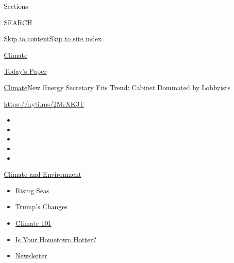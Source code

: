 Sections

SEARCH

\protect\hyperlink{site-content}{Skip to
content}\protect\hyperlink{site-index}{Skip to site index}

\href{https://www.nytimes.com/section/climate}{Climate}

\href{https://myaccount.nytimes.com/auth/login?response_type=cookie\&client_id=vi}{}

\href{https://www.nytimes.com/section/todayspaper}{Today's Paper}

\href{/section/climate}{Climate}\textbar{}New Energy Secretary Fits
Trend: Cabinet Dominated by Lobbyists

\url{https://nyti.ms/2MrXK3T}

\begin{itemize}
\item
\item
\item
\item
\item
\end{itemize}

\href{https://www.nytimes.com/section/climate?action=click\&pgtype=Article\&state=default\&region=TOP_BANNER\&context=storylines_menu}{Climate
and Environment}

\begin{itemize}
\tightlist
\item
  \href{https://www.nytimes.com/2020/07/30/climate/sea-level-inland-floods.html?action=click\&pgtype=Article\&state=default\&region=TOP_BANNER\&context=storylines_menu}{Rising
  Seas}
\item
  \href{https://www.nytimes.com/interactive/2020/climate/trump-environment-rollbacks.html?action=click\&pgtype=Article\&state=default\&region=TOP_BANNER\&context=storylines_menu}{Trump's
  Changes}
\item
  \href{https://www.nytimes.com/interactive/2020/04/19/climate/climate-crash-course-1.html?action=click\&pgtype=Article\&state=default\&region=TOP_BANNER\&context=storylines_menu}{Climate
  101}
\item
  \href{https://www.nytimes.com/interactive/2018/08/30/climate/how-much-hotter-is-your-hometown.html?action=click\&pgtype=Article\&state=default\&region=TOP_BANNER\&context=storylines_menu}{Is
  Your Hometown Hotter?}
\item
  \href{https://www.nytimes.com/newsletters/climate-change?action=click\&pgtype=Article\&state=default\&region=TOP_BANNER\&context=storylines_menu}{Newsletter}
\end{itemize}

